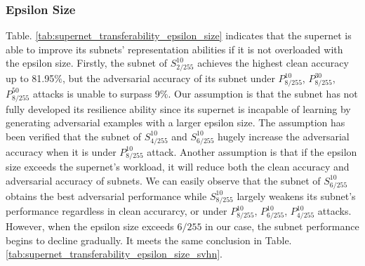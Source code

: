\documentclass[journal]{IEEEtran}
\begin{document}
\subsubsection{\textbf{Epsilon Size}}
Table. \ref{tab:supernet_transferability_epsilon_size} indicates that the supernet is able to improve its subnets' representation abilities if it is not overloaded with the epsilon size. Firstly, the subnet of $S_{2/255}^{10}$ achieves the highest clean accuracy up to 81.95$\%$, but the adversarial accuracy of its subnet under $P_{8/255}^{10}$, $P_{8/255}^{30}$, $P_{8/255}^{50}$ attacks is unable to surpass 9$\%$. Our assumption is that the subnet has not fully developed its resilience ability since its supernet is incapable of learning by generating adversarial examples with a larger epsilon size. The assumption has been verified that the subnet of $S_{4/255}^{10}$ and $S_{6/255}^{10}$ hugely increase the adversarial accuracy when it is under $P_{8/255}^{10}$ attack.  Another assumption is that if the epsilon size exceeds the supernet's workload, it will reduce both the clean accuracy and adversarial accuracy of subnets. We can easily observe that the subnet of $S_{6/255}^{10}$ obtains the best adversarial performance while $S_{8/255}^{10}$ largely weakens its subnet's performance regardless in clean accurarcy, or under $P_{8/255}^{10}$, $P_{6/255}^{10}$, $P_{4/255}^{10}$ attacks. However, when the epsilon size exceeds $6/255$ in our case, the subnet performance begins to decline gradually. It meets the same conclusion in Table. \ref{tab:supernet_transferability_epsilon_size_svhn}.
\end{document}
